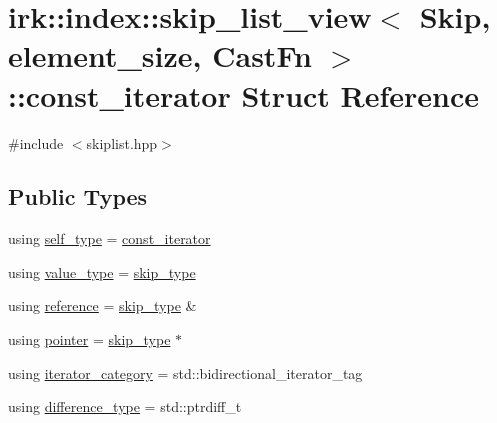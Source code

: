 \hypertarget{structirk_1_1index_1_1skip__list__view_1_1const__iterator}{}\section{irk\+:\+:index\+:\+:skip\+\_\+list\+\_\+view$<$ Skip, element\+\_\+size, Cast\+Fn $>$\+:\+:const\+\_\+iterator Struct Reference}
\label{structirk_1_1index_1_1skip__list__view_1_1const__iterator}


{\ttfamily \#include $<$skiplist.\+hpp$>$}

\subsection*{Public Types}
\begin{DoxyCompactItemize}
\item 
using \mbox{\hyperlink{structirk_1_1index_1_1skip__list__view_1_1const__iterator_a1b3eae3418d5b4d4f055a6841bd46ffa}{self\+\_\+type}} = \mbox{\hyperlink{structirk_1_1index_1_1skip__list__view_1_1const__iterator}{const\+\_\+iterator}}
\item 
using \mbox{\hyperlink{structirk_1_1index_1_1skip__list__view_1_1const__iterator_a7239886fa2b4671502a6712298b25324}{value\+\_\+type}} = \mbox{\hyperlink{classirk_1_1index_1_1skip__list__view_a7fa2224428803eee24062bb123978755}{skip\+\_\+type}}
\item 
using \mbox{\hyperlink{structirk_1_1index_1_1skip__list__view_1_1const__iterator_ad31e12de91ba22af75cfc00068f80e97}{reference}} = \mbox{\hyperlink{classirk_1_1index_1_1skip__list__view_a7fa2224428803eee24062bb123978755}{skip\+\_\+type}} \&
\item 
using \mbox{\hyperlink{structirk_1_1index_1_1skip__list__view_1_1const__iterator_a1bce3758616ad33105fa64b68a03bd8b}{pointer}} = \mbox{\hyperlink{classirk_1_1index_1_1skip__list__view_a7fa2224428803eee24062bb123978755}{skip\+\_\+type}} $\ast$
\item 
using \mbox{\hyperlink{structirk_1_1index_1_1skip__list__view_1_1const__iterator_aec63e523272f39b50e8420c465440494}{iterator\+\_\+category}} = std\+::bidirectional\+\_\+iterator\+\_\+tag
\item 
using \mbox{\hyperlink{structirk_1_1index_1_1skip__list__view_1_1const__iterator_afcba20bb907a231114679979015f77f5}{difference\+\_\+type}} = std\+::ptrdiff\+\_\+t
\end{DoxyCompactItemize}
